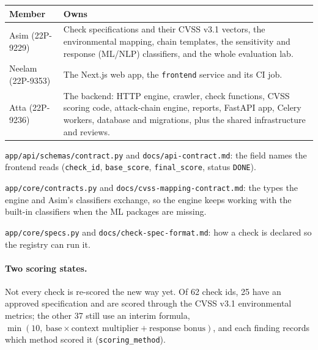 \begin{center}
\small
\begin{tabularx}{\linewidth}{@{}p{24mm}X@{}}
\toprule
\textbf{Member} & \textbf{Owns}\\
\midrule
Asim (22P-9229) & Check specifications and their CVSS v3.1 vectors, the environmental mapping, chain templates, the sensitivity and response (ML/NLP) classifiers, and the whole evaluation lab.\\
Neelam (22P-9353) & The Next.js web app, the \texttt{frontend} service and its CI job.\\
Atta (22P-9236) & The backend: HTTP engine, crawler, check functions, CVSS scoring code, attack-chain engine, reports, FastAPI app, Celery workers, database and migrations, plus the shared infrastructure and reviews.\\
\bottomrule
\end{tabularx}
\end{center}

\begin{description}[leftmargin=0pt,itemsep=3pt]
\item[API contract (v1).] \texttt{app/api/schemas/contract.py} and
\texttt{docs/api-contract.md}: the field names the frontend reads
(\texttt{check\_id}, \texttt{base\_score}, \texttt{final\_score}, status
\texttt{DONE}).
\item[ML / CVSS contract.] \texttt{app/core/contracts.py} and
\texttt{docs/cvss-mapping-contract.md}: the types the engine and Asim's
classifiers exchange, so the engine keeps working with the built-in
classifiers when the ML packages are missing.
\item[Check-spec format.] \texttt{app/core/specs.py} and
\texttt{docs/check-spec-format.md}: how a check is declared so the registry can
run it.
\end{description}

\paragraph{Two scoring states.} Not every check is re-scored the new way yet.
Of 62 check ids, 25 have an approved specification and are scored through the
CVSS v3.1 environmental metrics; the other 37 still use an interim formula,
$\min(10,\ \text{base}\times\text{context multiplier}+\text{response bonus})$,
and each finding records which method scored it
(\texttt{scoring\_method}).
